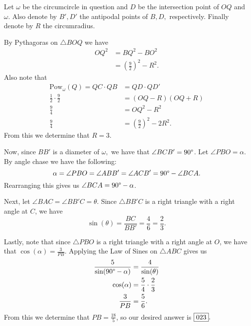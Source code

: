 \documentclass[letterpaper,oneside]{scrartcl}
\begin{document}
\begin{soln}
  Let \(\omega\) be the circumcircle in question and \(D\) be the intersection point of \(OQ\) and \(\omega\). Also denote by \(B', D'\) the antipodal points of \(B,D,\) respectively. Finally denote by \(R\) the circumradius.

  By Pythagoras on \(\triangle BOQ\) we have
  \begin{align*}
    {OQ}^2 & = {BQ}^2 - {BO}^2                   \\
           & = \left(\frac{9}{2}\right)^2 - R^2.
  \end{align*}
  Also note that
  \begin{align*}
    \text{Pow}_\omega(Q) = QC \cdot QB & = QD \cdot QD'                       \\
    \frac12 \cdot \frac92              & = (OQ-R)(OQ+R)                       \\
    \frac94                            & = {OQ}^2 - R^2                       \\
    \frac94                            & = \left(\frac{9}{2}\right)^2 - 2R^2.
  \end{align*}
  From this we determine that \(R = 3\).

  Now, since \(BB'\) is a diameter of \(\omega,\) we have that \(\angle BCB' = 90\degree\). Let \(\angle PBO = \alpha\). By angle chase we have the following:
  \[\alpha = \angle PBO = \angle ABB' = \angle ACB' = 90\degree - \angle BCA.\]
  Rearranging this gives us \(\angle BCA = 90\degree - \alpha\).

  Next, let \(\angle BAC = \angle BB'C = \theta\). Since \(\triangle BB'C\) is a right triangle with a right angle at \(C\), we have
  \[\sin(\theta) = \frac{BC}{BB'} = \frac{4}{6}= \frac23.\]

  Lastly, note that since \(\triangle PBO\) is a right triangle with a right angle at \(O\), we have that \(\cos(\alpha) = \frac{3}{PB}\). Applying the Law of Sines on \(\triangle ABC\) gives us
  \begin{align*}
    \frac{5}{\sin(90\degree - \alpha)} & = \frac{4}{\sin(\theta)} \\
    \cos(\alpha)                       & = \frac54 \cdot \frac23  \\
    \frac{3}{PB}                       & = \frac56.
  \end{align*}
  From this we determine that \(PB = \frac{18}{5}\), so our desired answer is \(\fbox{023}.\)
\end{soln}
\end{document}
